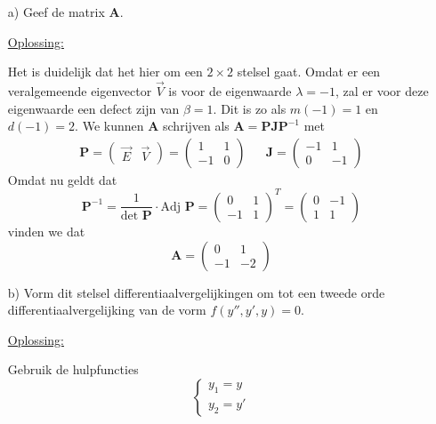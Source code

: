 \documentclass[kulak]{kulakarticle} %
\begin{document}
\begin{enumerate}
	\item[a)] Geef de matrix \(\textbf{A}\).

	\underline{Oplossing:}

	Het is duidelijk dat het hier om een \(2\times2\) stelsel gaat.
	Omdat er een veralgemeende eigenvector \(\vec{V}\) is voor de eigenwaarde \(\lambda=-1\), zal er voor deze eigenwaarde een defect zijn van \(\beta=1\). Dit is zo als \(m(-1)=1\) en \(d(-1)=2\).
	We kunnen \(\mathbf{A}\) schrijven als \(\mathbf{A}=\mathbf{PJP}^{-1}\) met
	\begin{align*}
		\mathbf{P} = \left( \begin{matrix}
			\vec{E} & \vec{V}
		\end{matrix} \right) = \left( \begin{matrix}
		1 & 1 \\
		-1 & 0
		\end{matrix} \right) & & \mathbf{J} = \left( \begin{matrix}
		-1 & 1 \\
		0 & -1
		\end{matrix} \right)
	\end{align*}
	Omdat nu geldt dat
	\[\textbf{P}^{-1}=\frac{1}{\text{det }\textbf{P}}\cdot\text{Adj }\textbf{P} = \left(\begin{matrix}
	0 & 1 \\
	-1 & 1
	\end{matrix}\right)^T=\left(\begin{matrix}
	0 & -1 \\
	1 & 1
	\end{matrix}\right)\]
	vinden we dat
	\[\mathbf{A}=\left(\begin{matrix}
		0 & 1 \\
		-1 & -2
	\end{matrix}\right)\]

	\item[b)] Vorm dit stelsel differentiaalvergelijkingen om tot een tweede orde differentiaalvergelijking van de vorm \(f(y'',y',y)=0\).

	\underline{Oplossing:}

	Gebruik de hulpfuncties
	\[	\begin{cases}
		y_1=y\\
		y_2=y'
	\end{cases}
	\]


\end{enumerate}
\end{document}
